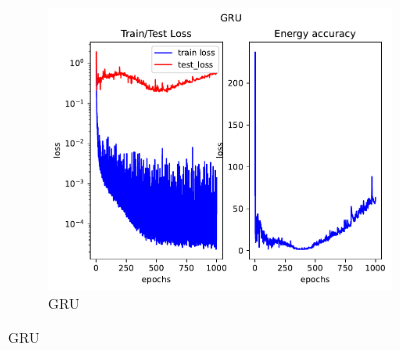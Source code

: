 \begin{figure}[H]
	\hfill
	\begin{subfigure}[b]{0.3\textwidth}
		\centering
		\includegraphics[width=\textwidth]{chapters/chapter5/osci_gru_loss.pdf}
		\caption{GRU}
	\end{subfigure}
	
	\vspace{0.5cm} %
	

\end{figure}
